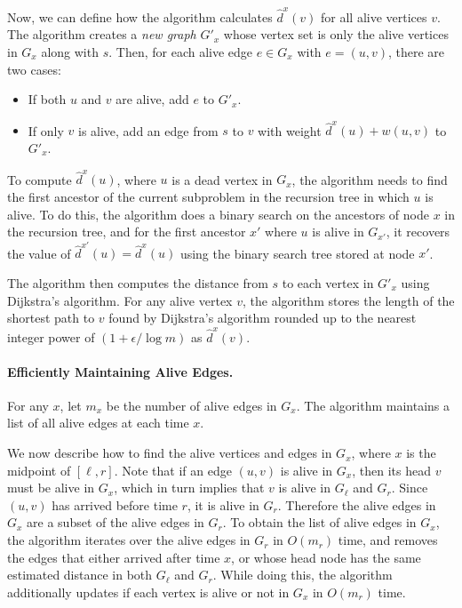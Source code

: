 Now, we can define how the algorithm calculates $\hat{d}^x(v)$ for all alive vertices $v$. 
The algorithm creates a \emph{new graph} $G'_x$ whose vertex set is only the alive vertices in $G_x$ along with $s$. Then, for each alive edge $e\in G_x$ with $e = (u,v)$, there are two cases:
\begin{itemize}
    \item If both $u$ and $v$ are alive,  add $e$ to $G'_x$.
    \item If only $v$ is alive, add an edge from $s$ to $v$ with weight $\hat{d}^x(u) + w(u,v)$ to $G'_x$.
\end{itemize}
To compute $\hat{d}^x(u)$, where $u$ is a dead vertex in $G_x$, the algorithm needs to find the first ancestor of the current subproblem in the recursion tree in which $u$ is alive.
To do this, the algorithm does a binary search on the ancestors of node $x$ in the recursion tree, and for the first ancestor $x'$ where $u$ is alive in $G_{x'}$, it recovers the value of $\hat{d}^{x'}(u)=\hat{d}^x(u)$ using the binary search tree stored at node $x'$. 

The algorithm then computes the distance from $s$ to each vertex in $G'_x$ using Dijkstra's algorithm.  For any alive vertex $v$, the algorithm stores the length of the shortest path to $v$ found by Dijkstra's algorithm rounded up to the nearest integer power of $(1+\epsilon/\log m)$ as $\hat{d}^x(v)$.  

\paragraph{Efficiently Maintaining Alive Edges.}
For any $x$, let $m_x$ be the number of alive edges in $G_x$.   The algorithm maintains
a list of all alive edges at each time $x$.  

We now describe how to find the alive vertices and edges in $G_x$, where $x$ is the midpoint of $[\ell, r]$.
Note that if an edge $(u,v)$ is alive in $G_x$, then its head $v$ must be alive in $G_x$, which in turn implies that $v$ is alive in $G_\ell$ and $G_r$. Since $(u,v)$ has arrived before time $r$, it is alive in $G_r$.
Therefore the alive edges in $G_x$ are a subset of the alive edges in $G_r$.
To obtain the list of alive edges in $G_x$, the algorithm iterates over the alive edges in $G_r$ in $O(m_r)$ time, and removes the edges that either arrived after time $x$, or whose head node has the same estimated distance in both $G_\ell$ and $G_r$.   
While doing this, the algorithm additionally updates if each vertex is alive or not in $G_x$ in $O(m_r)$ time.

